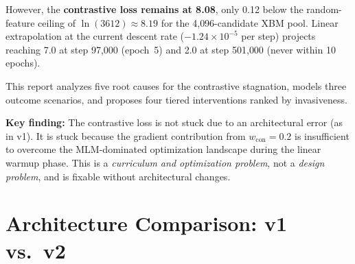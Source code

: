 \documentclass[11pt,a4paper]{article}
\begin{document}
However, the \textbf{contrastive loss remains at 8.08}, only 0.12 below the
random-feature ceiling of $\ln(3612) \approx 8.19$ for the 4{,}096-candidate XBM
pool. Linear extrapolation at the current descent rate ($-1.24 \times 10^{-5}$
per step) projects reaching 7.0 at step 97{,}000 (epoch~5) and 2.0 at step
501{,}000 (never within 10 epochs).

This report analyzes five root causes for the contrastive stagnation, models
three outcome scenarios, and proposes four tiered interventions ranked by
invasiveness.

\textbf{Key finding:} The contrastive loss is not stuck due to an architectural
error (as in v1). It is stuck because the gradient contribution from $w_{\text{con}} = 0.2$
is insufficient to overcome the MLM-dominated optimization landscape during the
linear warmup phase. This is a \emph{curriculum and optimization problem}, not a
\emph{design problem}, and is fixable without architectural changes.


\section{Architecture Comparison: v1 vs.\ v2}
\end{document}
